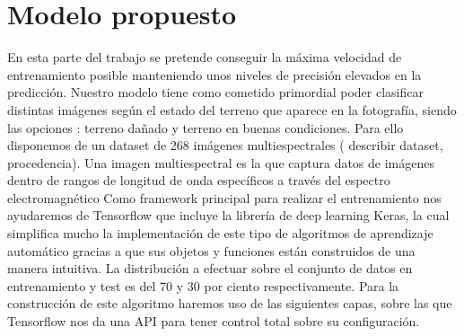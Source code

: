 \section{Modelo propuesto}\label{sec:modelo-propuesto}
En esta parte del trabajo se pretende conseguir la máxima velocidad de entrenamiento posible manteniendo unos niveles de precisión elevados en la predicción.
Nuestro modelo tiene como cometido primordial poder clasificar distintas imágenes según el estado del terreno que aparece en la fotografía, siendo las opciones : terreno dañado y
terreno en buenas condiciones.
Para ello disponemos de un dataset de 268 imágenes multiespectrales ( describir dataset, procedencia).
Una imagen multiespectral es la que captura datos de imágenes dentro de rangos de longitud de onda específicos a través del espectro electromagnético
Como framework principal para realizar el entrenamiento nos ayudaremos de Tensorflow que incluye la librería de deep learning Keras, la cual simplifica mucho la implementación de este tipo de algoritmos de
aprendizaje automático gracias a que sus objetos y funciones están construidos de una manera intuitiva.
La distribución a efectuar sobre el conjunto de datos en entrenamiento y test es del 70 y 30 por ciento respectivamente.
Para la construcción de este algoritmo haremos uso de las siguientes capas, sobre las que Tensorflow nos da una API para tener control total sobre su configuración.

